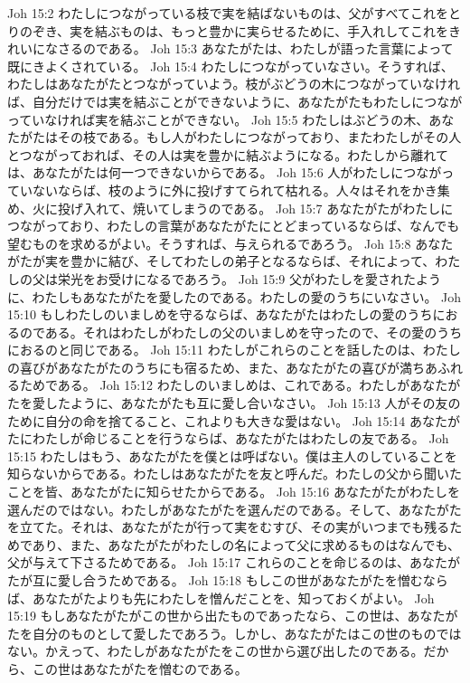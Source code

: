 Joh 15:2  わたしにつながっている枝で実を結ばないものは、父がすべてこれをとりのぞき、実を結ぶものは、もっと豊かに実らせるために、手入れしてこれをきれいになさるのである。
Joh 15:3  あなたがたは、わたしが語った言葉によって既にきよくされている。
Joh 15:4  わたしにつながっていなさい。そうすれば、わたしはあなたがたとつながっていよう。枝がぶどうの木につながっていなければ、自分だけでは実を結ぶことができないように、あなたがたもわたしにつながっていなければ実を結ぶことができない。
Joh 15:5  わたしはぶどうの木、あなたがたはその枝である。もし人がわたしにつながっており、またわたしがその人とつながっておれば、その人は実を豊かに結ぶようになる。わたしから離れては、あなたがたは何一つできないからである。
Joh 15:6  人がわたしにつながっていないならば、枝のように外に投げすてられて枯れる。人々はそれをかき集め、火に投げ入れて、焼いてしまうのである。
Joh 15:7  あなたがたがわたしにつながっており、わたしの言葉があなたがたにとどまっているならば、なんでも望むものを求めるがよい。そうすれば、与えられるであろう。
Joh 15:8  あなたがたが実を豊かに結び、そしてわたしの弟子となるならば、それによって、わたしの父は栄光をお受けになるであろう。
Joh 15:9  父がわたしを愛されたように、わたしもあなたがたを愛したのである。わたしの愛のうちにいなさい。
Joh 15:10  もしわたしのいましめを守るならば、あなたがたはわたしの愛のうちにおるのである。それはわたしがわたしの父のいましめを守ったので、その愛のうちにおるのと同じである。
Joh 15:11  わたしがこれらのことを話したのは、わたしの喜びがあなたがたのうちにも宿るため、また、あなたがたの喜びが満ちあふれるためである。
Joh 15:12  わたしのいましめは、これである。わたしがあなたがたを愛したように、あなたがたも互に愛し合いなさい。
Joh 15:13  人がその友のために自分の命を捨てること、これよりも大きな愛はない。
Joh 15:14  あなたがたにわたしが命じることを行うならば、あなたがたはわたしの友である。
Joh 15:15  わたしはもう、あなたがたを僕とは呼ばない。僕は主人のしていることを知らないからである。わたしはあなたがたを友と呼んだ。わたしの父から聞いたことを皆、あなたがたに知らせたからである。
Joh 15:16  あなたがたがわたしを選んだのではない。わたしがあなたがたを選んだのである。そして、あなたがたを立てた。それは、あなたがたが行って実をむすび、その実がいつまでも残るためであり、また、あなたがたがわたしの名によって父に求めるものはなんでも、父が与えて下さるためである。
Joh 15:17  これらのことを命じるのは、あなたがたが互に愛し合うためである。
Joh 15:18  もしこの世があなたがたを憎むならば、あなたがたよりも先にわたしを憎んだことを、知っておくがよい。
Joh 15:19  もしあなたがたがこの世から出たものであったなら、この世は、あなたがたを自分のものとして愛したであろう。しかし、あなたがたはこの世のものではない。かえって、わたしがあなたがたをこの世から選び出したのである。だから、この世はあなたがたを憎むのである。
